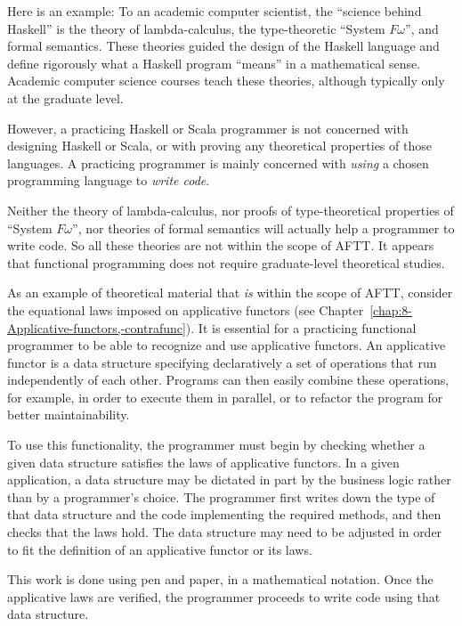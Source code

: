 Here is an example: To an academic computer scientist, the ``science
behind Haskell'' is the theory of lambda-calculus, the type-theoretic
``System $F\omega$'', and formal semantics. These theories guided
the design of the Haskell language and define rigorously what a Haskell
program ``means'' in a mathematical sense. Academic computer science
courses teach these theories, although typically only at the graduate
level. 

However, a practicing Haskell or Scala programmer is not concerned
with designing Haskell or Scala, or with proving any theoretical properties
of those languages. A practicing programmer is mainly concerned with
\emph{using} a chosen programming language to \emph{write code}. 

Neither the theory of lambda-calculus, nor proofs of type-theoretical
properties of ``System $F\omega$'', nor theories of formal semantics
will actually help a programmer to write code. So all these theories
are not within the scope of AFTT. It appears that functional programming
does not require graduate-level theoretical studies.

As an example of theoretical material that \emph{is} within the scope
of AFTT, consider the equational laws imposed on applicative functors
(see Chapter~\ref{chap:8-Applicative-functors,-contrafunc}).
It is essential for a practicing functional programmer to be able
to recognize and use applicative functors. An applicative functor
is a data structure specifying declaratively a set of operations that
run independently of each other. Programs can then easily combine
these operations, for example, in order to execute them in parallel,
or to refactor the program for better maintainability.

To use this functionality, the programmer must begin by checking whether
a given data structure satisfies the laws of applicative functors.
In a given application, a data structure may be dictated in part by
the business logic rather than by a programmer's choice. The programmer
first writes down the type of that data structure and the code implementing
the required methods, and then checks that the laws hold. The data
structure may need to be adjusted in order to fit the definition of
an applicative functor or its laws.

This work is done using pen and paper, in a mathematical notation.
Once the applicative laws are verified, the programmer proceeds to
write code using that data structure.

